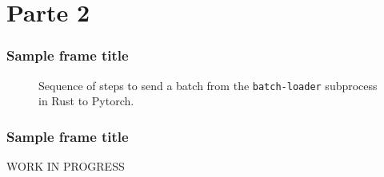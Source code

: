 \section{Parte 2}

\begin{frame}
\frametitle{Sample frame title}

\begin{figure}[H]
\centering
{}
\caption{Sequence of steps to send a batch from the \texttt{batch-loader} subprocess in Rust to Pytorch.}
\label{training-loop}
\end{figure}
\end{frame}


\begin{frame}
\frametitle{Sample frame title}
WORK IN PROGRESS
\end{frame}


